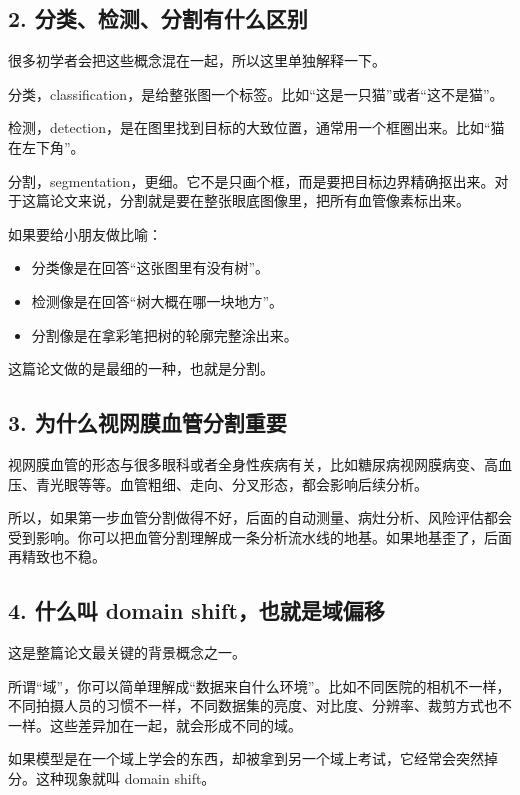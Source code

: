 \documentclass[12pt,a4paper]{ctexart}
\begin{document}
\subsection*{2. 分类、检测、分割有什么区别}

很多初学者会把这些概念混在一起，所以这里单独解释一下。

分类，classification，是给整张图一个标签。比如“这是一只猫”或者“这不是猫”。

检测，detection，是在图里找到目标的大致位置，通常用一个框圈出来。比如“猫在左下角”。

分割，segmentation，更细。它不是只画个框，而是要把目标边界精确抠出来。对于这篇论文来说，分割就是要在整张眼底图像里，把所有血管像素标出来。

如果要给小朋友做比喻：

\begin{itemize}[leftmargin=1.6em]
  \item 分类像是在回答“这张图里有没有树”。
  \item 检测像是在回答“树大概在哪一块地方”。
  \item 分割像是在拿彩笔把树的轮廓完整涂出来。
\end{itemize}

这篇论文做的是最细的一种，也就是分割。

\subsection*{3. 为什么视网膜血管分割重要}

视网膜血管的形态与很多眼科或者全身性疾病有关，比如糖尿病视网膜病变、高血压、青光眼等等。血管粗细、走向、分叉形态，都会影响后续分析。

所以，如果第一步血管分割做得不好，后面的自动测量、病灶分析、风险评估都会受到影响。你可以把血管分割理解成一条分析流水线的地基。如果地基歪了，后面再精致也不稳。

\subsection*{4. 什么叫 domain shift，也就是域偏移}

这是整篇论文最关键的背景概念之一。

所谓“域”，你可以简单理解成“数据来自什么环境”。比如不同医院的相机不一样，不同拍摄人员的习惯不一样，不同数据集的亮度、对比度、分辨率、裁剪方式也不一样。这些差异加在一起，就会形成不同的域。

如果模型是在一个域上学会的东西，却被拿到另一个域上考试，它经常会突然掉分。这种现象就叫 domain shift。
\end{document}
